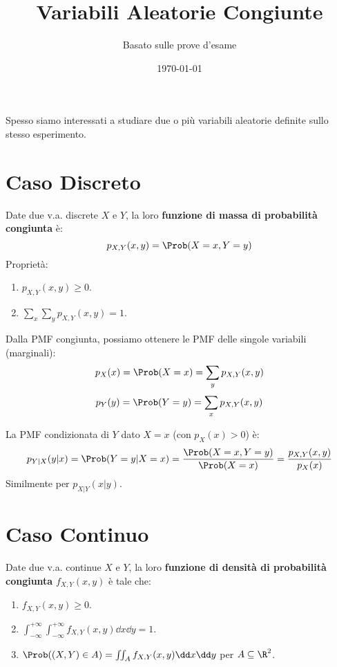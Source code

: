 

\title{Variabili Aleatorie Congiunte}
\author{Basato sulle prove d'esame}
\date{\today}



\maketitle
\tableofcontents
\newpage

\label{cap:va_congiunte}
Spesso siamo interessati a studiare due o più variabili aleatorie definite sullo stesso esperimento.

\section{Caso Discreto}
\begin{definition}
Date due v.a. discrete $X$ e $Y$, la loro \textbf{funzione di massa di probabilità congiunta} è:
\[ p_{X,Y}(x,y) = \Prob(X=x, Y=y) \]
Proprietà:
\begin{enumerate}
    \item $p_{X,Y}(x,y) \ge 0$.
    \item $\sum_x \sum_y p_{X,Y}(x,y) = 1$.
\end{enumerate}
\end{definition}

\begin{definition}
Dalla PMF congiunta, possiamo ottenere le PMF delle singole variabili (marginali):
\[ p_X(x) = \Prob(X=x) = \sum_y p_{X,Y}(x,y) \]
\[ p_Y(y) = \Prob(Y=y) = \sum_x p_{X,Y}(x,y) \]
\end{definition}

\begin{definition}
La PMF condizionata di $Y$ dato $X=x$ (con $p_X(x)>0$) è:
\[ p_{Y|X}(y|x) = \Prob(Y=y|X=x) = \frac{\Prob(X=x, Y=y)}{\Prob(X=x)} = \frac{p_{X,Y}(x,y)}{p_X(x)} \]
Similmente per $p_{X|Y}(x|y)$.
\end{definition}

\section{Caso Continuo}
\begin{definition}
Date due v.a. continue $X$ e $Y$, la loro \textbf{funzione di densità di probabilità congiunta} $f_{X,Y}(x,y)$ è tale che:
\begin{enumerate}
    \item $f_{X,Y}(x,y) \ge 0$.
    \item $\int_{-\infty}^{+\infty} \int_{-\infty}^{+\infty} f_{X,Y}(x,y) \dd x \dd y = 1$.
    \item $\Prob((X,Y) \in A) = \iint_A f_{X,Y}(x,y) \dd x \dd y$ per $A \subseteq \R^2$.
\end{enumerate}
\end{definition}

